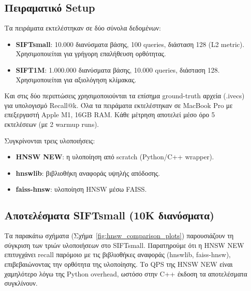 \documentclass[12pt,a4paper]{article}
\begin{document}
\subsection{Πειραματικό Setup}
Τα πειράματα εκτελέστηκαν σε δύο σύνολα δεδομένων:
\begin{itemize}
  \item \textbf{SIFTsmall}: 10.000 διανύσματα βάσης, 100 queries, διάσταση 128 (L2 metric). Χρησιμοποιείται για γρήγορη επαλήθευση ορθότητας.
  \item \textbf{SIFT1M}: 1.000.000 διανύσματα βάσης, 10.000 queries, διάσταση 128. Χρησιμοποιείται για αξιολόγηση κλίμακας.
\end{itemize}
Και στις δύο περιπτώσεις χρησιμοποιούνται τα επίσημα ground-truth αρχεία (.ivecs) για υπολογισμό Recall@k. Όλα τα πειράματα εκτελέστηκαν σε MacBook Pro με επεξεργαστή Apple M1, 16GB RAM. Κάθε μέτρηση αποτελεί μέσο όρο 5 εκτελέσεων (με 2 warmup runs).

Συγκρίνονται τρεις υλοποιήσεις:
\begin{itemize}
  \item \textbf{HNSW NEW}: η υλοποίηση από scratch (Python/C++ wrapper).
  \item \textbf{hnswlib}: βιβλιοθήκη αναφοράς υψηλής απόδοσης.
  \item \textbf{faiss-hnsw}: υλοποίηση HNSW μέσω FAISS.
\end{itemize}

\subsection{Αποτελέσματα SIFTsmall (10K διανύσματα)}

Τα παρακάτω σχήματα (Σχήμα~\ref{fig:hnsw_comparison_plots}) παρουσιάζουν τη σύγκριση των τριών υλοποιήσεων στο SIFTsmall. Παρατηρούμε ότι η HNSW NEW επιτυγχάνει recall παρόμοιο με τις βιβλιοθήκες αναφοράς (hnswlib, faiss-hnsw), επιβεβαιώνοντας την ορθότητα της υλοποίησης. Το QPS της HNSW NEW είναι χαμηλότερο λόγω της Python overhead, ωστόσο στην C++ έκδοση τα αποτελέσματα συγκλίνουν.
\end{document}
